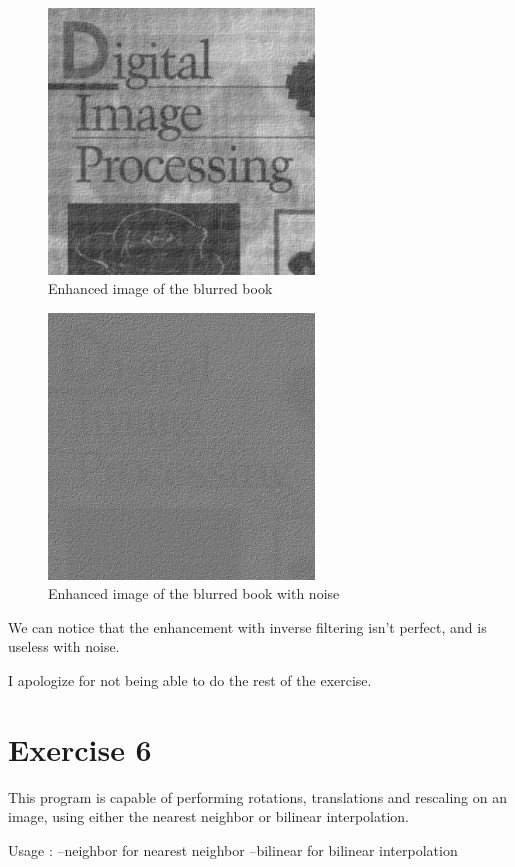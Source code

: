 \documentclass[10pt]{article}
\begin{document}
\begin{figure}[!ht]
	\centering
	\includegraphics[height=200pt]{./ex5/filteredBook.jpg}
	\caption{Enhanced image of the blurred book}
\end{figure}
\begin{figure}[!ht]
	\centering
	\includegraphics[height=200pt]{./ex5/filteredGaussBook.jpg}
	\caption{Enhanced image of the blurred book with noise}
\end{figure}
\clearpage

We can notice that the enhancement with inverse filtering isn't perfect, and is useless with noise.

I apologize for not being able to do the rest of the exercise.

\section{Exercise 6}
This program is capable of performing rotations, translations and rescaling on an image, using either the nearest neighbor or bilinear interpolation.

Usage :
--neighbor for nearest neighbor
--bilinear for bilinear interpolation
\end{document}
